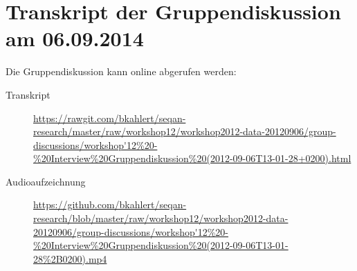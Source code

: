 \section[Gruppendiskussions-Transkript, 06.09.2014]{Transkript der Gruppendiskussion am 06.09.2014}
\label{app:gruppendiskussion}

Die Gruppendiskussion kann online abgerufen werden:

\begin{description}
  \item[Transkript] \url{https://rawgit.com/bkahlert/seqan-research/master/raw/workshop12/workshop2012-data-20120906/group-discussions/workshop'12\%20-\%20Interview\%20Gruppendiskussion\%20(2012-09-06T13-01-28+0200).html}
  \item[Audioaufzeichnung] \url{https://github.com/bkahlert/seqan-research/blob/master/raw/workshop12/workshop2012-data-20120906/group-discussions/workshop'12\%20-\%20Interview\%20Gruppendiskussion\%20(2012-09-06T13-01-28\%2B0200).mp4}
\end{description}